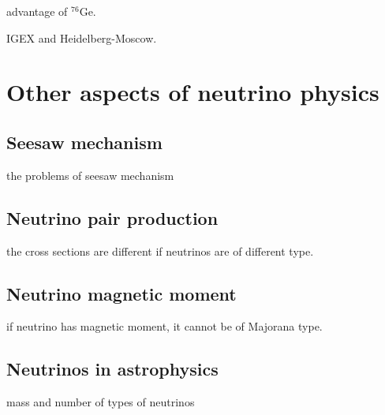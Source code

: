 advantage of $^{76}$Ge.

IGEX and Heidelberg-Moscow.

\section{Other aspects of neutrino physics}
\label{sec:others}

\subsection{Seesaw mechanism}
\label{sec:seesaw}
the problems of seesaw mechanism

\subsection{Neutrino pair production}
\label{sec:pair}
the cross sections are different if neutrinos are of different type.

\subsection{Neutrino magnetic moment}
\label{sec:mag}
if neutrino has magnetic moment, it cannot be of Majorana type.

\subsection{Neutrinos in astrophysics}
\label{sec:astro}
mass and number of types of neutrinos



